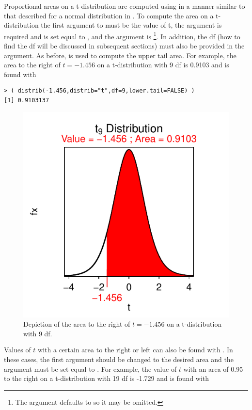 \documentclass[10pt,openany]{book}\usepackage[]{graphicx}\usepackage[]{color}
\makeatletter
\newenvironment{kframe}{%
 \def\at@end@of@kframe{}%
 \ifinner\ifhmode%
  \def\at@end@of@kframe{\end{minipage}}%
  \begin{minipage}{\columnwidth}%
 \fi\fi%
 \def\FrameCommand##1{\hskip\@totalleftmargin \hskip-\fboxsep
 \colorbox{shadecolor}{##1}\hskip-\fboxsep
     \hskip-\linewidth \hskip-\@totalleftmargin \hskip\columnwidth}%
 \MakeFramed {\advance\hsize-\width
   \@totalleftmargin\z@ \linewidth\hsize
   \@setminipage}}%
 {\par\unskip\endMakeFramed%
 \at@end@of@kframe}
\newenvironment{knitrout}{}{} %
\makeatother
\begin{document}

Proportional areas on a t-distribution are computed using  in a manner similar to that described for a normal distribution in .  To compute the area on a t-distribution the first argument to  must be the value of t, the  argument is required and is set equal to , and the  argument is \footnote{The  argument defaults to  so it may be omitted.}.  In addition, the df (how to find the df will be discussed in subsequent sections) must also be provided in the  argument.  As before,  is used to compute the upper tail area.  For example, the area to the right of $t=-1.456$ on a t-distribution with 9 df is 0.9103  and is found with

\begin{knitrout}
\color{fgcolor}\begin{kframe}
\begin{verbatim}
> ( distrib(-1.456,distrib="t",df=9,lower.tail=FALSE) )
[1] 0.9103137
\end{verbatim}
\end{kframe}\begin{figure}[hbtp]

{\centering \includegraphics[width=.4\linewidth]{Figs/tarea1-1} 

}

\caption[Depiction of the area to the right of $t=-1.456$ on a t-distribution with 9 df]{Depiction of the area to the right of $t=-1.456$ on a t-distribution with 9 df.}\label{fig:tarea1}
\end{figure}


\end{knitrout}

Values of $t$ with a certain area to the right or left can also be found with .  In these cases, the first argument should be changed to the desired area and the  argument must be set equal to .  For example, the value of $t$ with an area of 0.95 to the right on a t-distribution with 19 df is -1.729  and is found with
\end{document}
